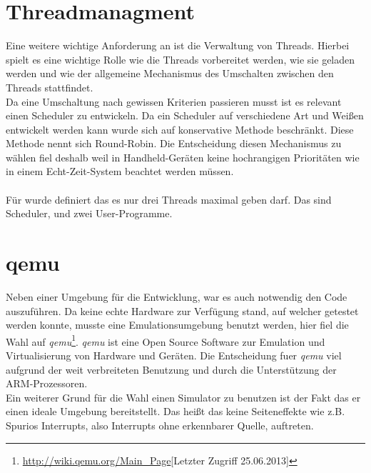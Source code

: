 \section{Threadmanagment}
Eine weitere wichtige Anforderung an \mops ist die Verwaltung von Threads. Hierbei spielt es eine wichtige Rolle wie die Threads vorbereitet werden, wie sie geladen werden und wie der allgemeine Mechanismus des Umschalten zwischen den Threads stattfindet.\\
Da eine Umschaltung nach gewissen Kriterien passieren musst ist es relevant einen Scheduler zu entwickeln. Da ein Scheduler auf verschiedene Art und Wei\ss en entwickelt werden kann wurde sich auf konservative Methode beschr\"ankt. Diese Methode nennt sich Round-Robin. Die Entscheidung diesen Mechanismus zu w\"ahlen fiel deshalb weil in Handheld-Ger\"aten keine hochrangigen Priorit\"aten wie in einem Echt-Zeit-System beachtet werden m\"ussen.\\ \\
F\"ur \mops wurde definiert das es nur drei Threads maximal geben darf. Das sind Scheduler, und zwei User-Programme.
\section{qemu}
Neben einer Umgebung f\"ur die Entwicklung, war es auch notwendig den Code auszuf\"uhren. Da keine echte Hardware zur Verf\"ugung stand, auf welcher \mops getestet werden konnte, musste eine Emulationsumgebung benutzt werden, hier fiel die Wahl auf \textit{qemu}\footnote{\url{http://wiki.qemu.org/Main_Page}[Letzter Zugriff 25.06.2013]}. \textit{qemu} ist eine Open Source Software zur Emulation und Virtualisierung von Hardware und Ger\"aten. Die Entscheidung fuer \textit{qemu} viel aufgrund der weit verbreiteten Benutzung und durch die Unterst\"utzung der ARM-Prozessoren.\\
Ein weiterer Grund f\"ur die Wahl einen Simulator zu benutzen ist der Fakt das er einen ideale Umgebung bereitstellt. Das hei\ss t das keine Seiteneffekte wie z.B. Spurios Interrupts, also Interrupts ohne erkennbarer Quelle, auftreten.
